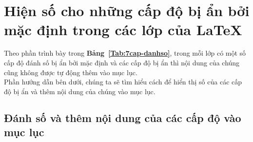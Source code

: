 \documentclass[12pt,a4paper]{article}
\newcommand{\tab}[1]{\textbf{Bảng~#1}}
\begin{document}
\section{Hiện số cho những cấp độ bị ẩn bởi mặc định trong các lớp của \LaTeX}
Theo phần trình bày trong \tab{\ref{Tab:7cap-danhso}}, trong mỗi lớp có một số cấp độ đánh số bị ẩn bởi mặc định và các cấp độ bị ẩn thì nội dung của chúng cũng không được tự động thêm vào mục lục.\\

Phần hướng dẫn bên dưới, chúng ta sẽ tìm hiểu cách để hiển thị số của các cấp độ bị ẩn và thêm nội dung của chúng vào mục lục.

\subsection{Đánh số và thêm nội dung của các cấp độ vào mục lục}
\end{document}
